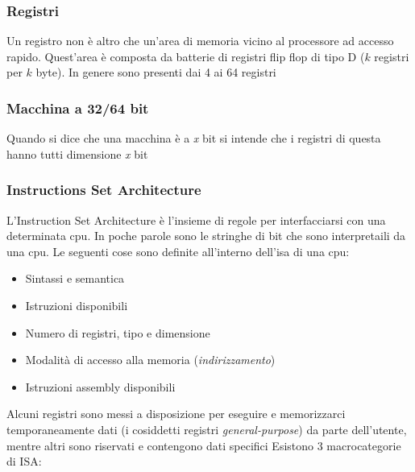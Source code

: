 \subsubsection*{Registri}
Un registro non è altro che un'area di memoria vicino al processore ad accesso rapido. Quest'area è composta da batterie di registri flip flop di tipo D ($ k $ registri per $ k $ byte). In genere sono presenti dai 4 ai 64 registri
\subsubsection*{Macchina a 32/64 bit}
Quando si dice che una macchina è a \textit{x} bit si intende che i registri di questa hanno tutti dimensione \textit{x} bit
\subsubsection*{Instructions Set Architecture}
L'Instruction Set Architecture è l'insieme di regole per interfacciarsi con una determinata cpu. In poche parole sono le stringhe di bit che sono interpretaili da una cpu. Le seguenti cose sono definite all'interno dell'isa di una cpu:
\begin{itemize}
	\item Sintassi e semantica
	\item Istruzioni disponibili
	\item Numero di registri, tipo e dimensione
	\item Modalità di accesso alla memoria (\textit{indirizzamento})
	\item Istruzioni assembly disponibili
\end{itemize}
Alcuni registri sono messi a disposizione per eseguire e memorizzarci temporaneamente dati (i cosiddetti registri \textit{general-purpose}) da parte dell'utente, mentre altri sono riservati e contengono dati specifici
\vskip3mm
Esistono 3 macrocategorie di ISA:
